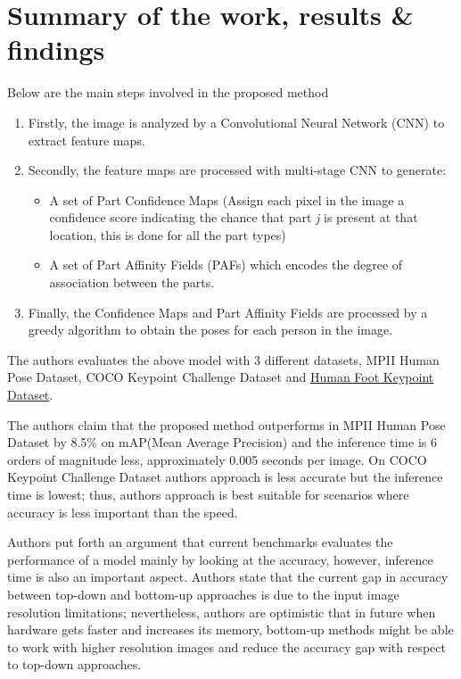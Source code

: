 \documentclass[twocolumn]{article}
\begin{document}
\section{Summary of the work, results \& findings}
Below are the main steps involved in the proposed method
\begin{enumerate}
	\item Firstly, the image is analyzed by a Convolutional Neural Network (CNN) to extract feature maps.
	\item Secondly, the feature maps are processed with multi-stage CNN to generate: 
	\begin{itemize}
		\item A set of Part Confidence Maps (Assign each pixel in the image a confidence score indicating the chance that  part \emph{j} is present at that location, this is done for all the part types)
		\item  A set of Part Affinity Fields (PAFs) which encodes the degree of association between the parts.
	\end{itemize}
	\item Finally, the Confidence Maps and Part Affinity Fields are processed by a greedy algorithm to obtain the poses for each person in the image.	
\end{enumerate}

The authors evaluates the above model with 3 different datasets, MPII Human Pose Dataset\cite{andriluka20142d}, COCO Keypoint Challenge Dataset\cite{lin2014microsoft} and \href{https://cmu-perceptual-computing-lab.github.io/foot_keypoint_dataset/}{Human Foot Keypoint Dataset}.

The authors claim that the proposed method outperforms \cite{insafutdinov2016deepercut} in MPII Human Pose Dataset\cite{andriluka20142d} by 8.5\% on mAP(Mean Average Precision) and the inference time is 6 orders of magnitude less, approximately 0.005 seconds per image. On COCO Keypoint Challenge Dataset\cite{lin2014microsoft} authors approach is less accurate but the inference time is lowest; thus, authors approach is best suitable for scenarios where accuracy is less important than the speed. 

Authors put forth an argument that current benchmarks evaluates the performance of a model mainly by looking at the accuracy, however, inference time is also an important aspect. Authors state that the current gap in accuracy between top-down and bottom-up approaches is due to the input image resolution limitations; nevertheless, authors are optimistic that in future when hardware gets faster and increases its memory, bottom-up methods might be able to work with higher resolution images and reduce the accuracy gap with respect to top-down approaches. 
\end{document}
